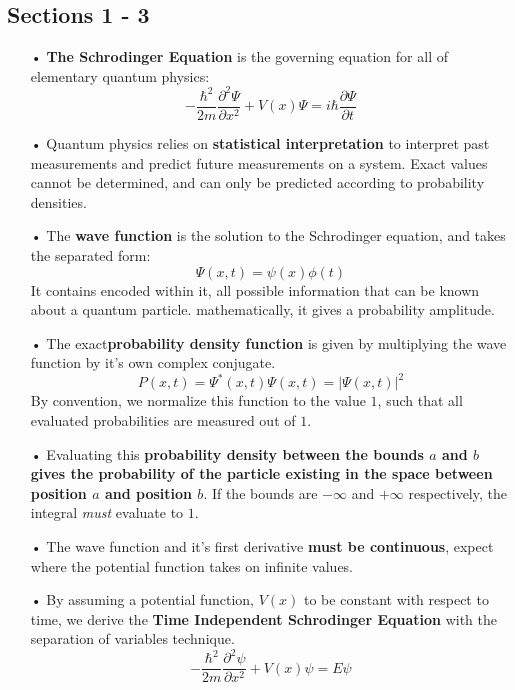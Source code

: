 \documentclass[12pt,letterpaper]{book}
\begin{document}
\subsection*{Sections 1 - 3}
\begin{enumerate}
\item[•]\textbf{The Schrodinger Equation} is the governing equation for all of elementary quantum physics:
\begin{equation}
-\frac{\hbar^2}{2m}\frac{\partial^2 \Psi}{\partial x^2} + V(x)\Psi = i\hbar\frac{\partial \Psi}{\partial t}
\end{equation}
\item[•]Quantum physics relies on \textbf{statistical interpretation} to interpret past measurements and predict future measurements on a system. Exact values cannot be determined, and can only be predicted according to probability densities.
\item[•]The \textbf{wave function} is the solution to the Schrodinger equation, and takes the separated form:
\begin{equation}
\Psi(x,t) = \psi(x)\phi(t)
\end{equation}
It contains encoded within it, all possible information that can be known about a quantum particle. mathematically, it gives a probability amplitude.
\item[•]The exact\textbf{probability density function} is given by multiplying the wave function by it's own complex conjugate.
\begin{equation}
P(x,t) = \Psi^*(x,t)\Psi(x,t) = |\Psi(x,t)|^2
\end{equation}
By convention, we normalize this function to the value $1$, such that all evaluated probabilities are measured out of $1$.
\item[•]Evaluating this \textbf{probability density between the bounds $a$ and $b$ gives the probability of the particle existing in the space between position $a$ and position $b$}. If the bounds are $-\infty$ and $+\infty$ respectively, the integral \textit{must} evaluate to $1$.
\item[•]The wave function and it's first derivative \textbf{must be continuous}, expect where the potential function takes on infinite values.
\item[•]By assuming a potential function, $V(x)$ to be constant with respect to time, we derive the \textbf{Time Independent Schrodinger Equation} with the separation of variables technique.
\begin{equation}
-\frac{\hbar^2}{2m}\frac{\partial^2 \psi}{\partial x^2} + V(x)\psi = E\psi

\end{equation}
\end{enumerate}
\end{document}
